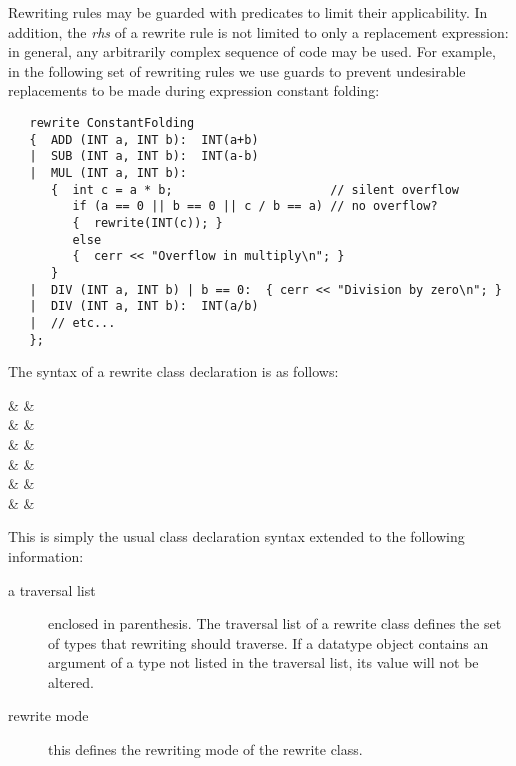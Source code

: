  
  
   Rewriting rules may be guarded with predicates to limit their
applicability.  In addition, the {\em rhs} of a rewrite rule is not limited
to only a replacement expression: in general, any arbitrarily complex sequence
of code may be used.  For example, in the following set of rewriting
rules we use guards to prevent undesirable replacements to be made during
expression constant folding:
 
\begin{verbatim}
   rewrite ConstantFolding
   {  ADD (INT a, INT b):  INT(a+b)
   |  SUB (INT a, INT b):  INT(a-b)
   |  MUL (INT a, INT b):
      {  int c = a * b;                      // silent overflow
         if (a == 0 || b == 0 || c / b == a) // no overflow?
         {  rewrite(INT(c)); }
         else
         {  cerr << "Overflow in multiply\n"; }
      }
   |  DIV (INT a, INT b) | b == 0:  { cerr << "Division by zero\n"; }
   |  DIV (INT a, INT b):  INT(a/b)
   |  // etc...
   };
\end{verbatim}

 \label{sec:rewrite-class}

The syntax of a rewrite class declaration is as follows:

\begin{syntax}
 & \IS &  \Id 
            \T{(}  \T{)} \\
   & & \quad {} 
         \\
   & & \quad \T{\{}  \T{\}} \T{;} \\
 & \IS &  \\
                  & \OR &  \\
                  & \OR &  \\
\end{syntax}

This is simply the usual \Cpp{} class declaration syntax
extended to the following information:
\begin{description}
   \item[a traversal list] enclosed in parenthesis.  The traversal
list of a rewrite class defines the set of types that rewriting
should traverse.  If a datatype object contains an argument of a type
not listed in the traversal list, its value will not be altered.
   \item[rewrite mode] this defines the rewriting mode of the
rewrite class.
\end{description}

